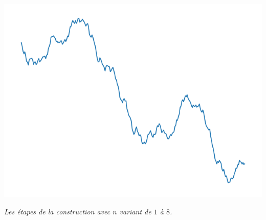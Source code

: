 \documentclass[11pt,class=report,crop=false]{standalone}
\begin{document}
\begin{exemple}
\begin{center}
\includegraphics[scale=\myscale,scale=0.2]{figures/landscape-03-8}

\nopagebreak

\begin{minipage}{0.8\textwidth}
\center\emph{
Les étapes de la construction avec $n$ variant de $1$ à $8$.}
\end{minipage}

\end{center}


\end{exemple}
\end{document}
